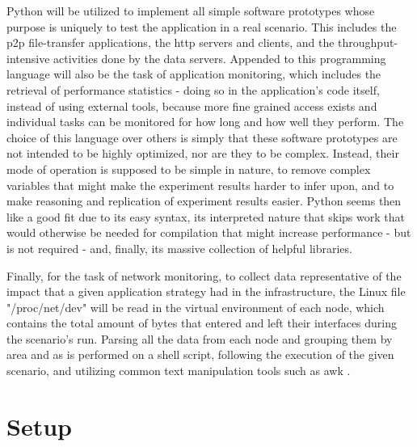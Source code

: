     Python \cite{python} will be utilized to implement all simple software prototypes whose purpose is uniquely to test the application in a real scenario.
    This includes the \gls{p2p} file-transfer applications, the \gls{http} servers and clients, and the throughput-intensive activities done by the data servers.
    Appended to this programming language will also be the task of application monitoring, which includes the retrieval of performance statistics - doing so in the application's code itself, instead of using external tools, because more fine grained access exists and individual tasks can be monitored for how long and how well they perform.
    The choice of this language over others is simply that these software prototypes are not intended to be highly optimized, nor are they to be complex.
    Instead, their mode of operation is supposed to be simple in nature, to remove complex variables that might make the experiment results harder to infer upon, and to make reasoning and replication of experiment results easier.
    Python seems then like a good fit due to its easy syntax, its interpreted nature that skips work that would otherwise be needed for compilation that might increase performance - but is not required - and, finally, its massive collection of helpful libraries.


    Finally, for the task of network monitoring, to collect data representative of the impact that a given application strategy had in the infrastructure, the Linux file "/proc/net/dev" will be read in the virtual environment of each node, which contains the total amount of bytes that entered and left their interfaces during the scenario's run.
    Parsing all the data from each node and grouping them by area and \gls{as} is performed on a shell script, following the execution of the given scenario, and utilizing common text manipulation tools such as awk \cite{awk}.

\section{Setup}

\label{sec:experiments-setup}

